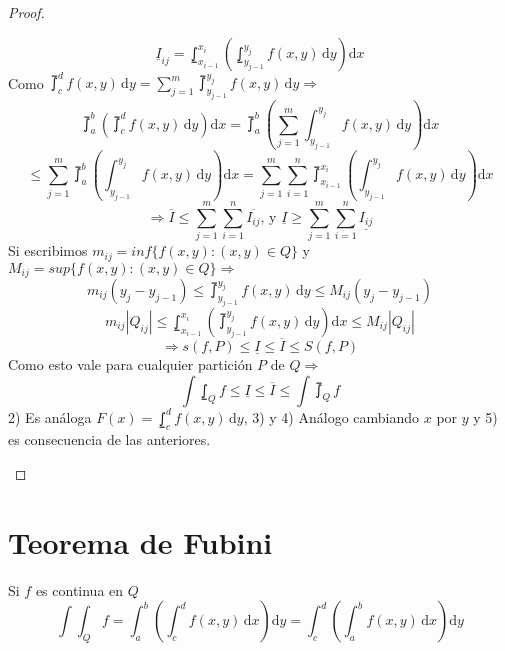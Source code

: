 \begin{theorem}
\begin{proof}
\begin{enumerate}
\begin{equation}
        \underline{I}_{ij} = \lowint_{x_{i-1}}^{x_i}( \lowint_{y_{j-1}}^{y_j}f(x, y)\,\mathrm{d}y)\mathrm{d}x
      \end{equation} Como $\upint_c^d f(x, y)\, \mathrm{d}y = \sum_{j = 1}^m \upint_{y_{j-1}}^{y_j} f(x, y)\, \mathrm{d}y \Rightarrow$ \begin{equation}
        \upint_a^b(\upint_c^d f(x, y)\, \mathrm{d}y)\mathrm{d}x = \upint_a^b( \sum_{j = 1}^m \int_{y_{j-1}}^{y_j}f(x, y)\, \mathrm{d}y)\mathrm{d}x
      \end{equation}
      \begin{equation}
        \leq \sum_{j = 1}^m \upint_a^b(\int_{y_{j-1}}^{y_j}f(x, y)\, \mathrm{d}y)\mathrm{d}x = \sum_{j = 1}^m \sum_{i = 1}^n \upint_{x_{i-1}}^{x_i}(\int_{y_{j-1}}^{y_j}f(x,y)\,\mathrm{d}y)\mathrm{d}x
      \end{equation}
      \begin{equation}
        \Rightarrow \overline{I} \leq \sum_{j = 1}^m \sum_{i = 1}^n \overline{I_{ij}} \text{, y } \underline{I} \geq \sum_{j = 1}^m \sum_{i = 1}^n \underline{I_{ij}}
      \end{equation}
      Si escribimos $m_{ij} = inf\{ f(x, y) : (x, y) \in Q \}$ y $M_{ij} = sup\{ f(x, y) : (x, y) \in Q\} \Rightarrow$ \begin{equation}
        m_{ij} (y_j - y_{j-1}) \leq \upint_{y_{j-1}}^{y_j} f(x, y)\, \mathrm{d} y \leq M_{ij} (y_j - y_{j-1})
      \end{equation}
      \begin{equation}
        m_{ij} |Q_{ij}| \leq \lowint_{x_{i-1}}^{x_i} ( \upint_{y_{j-1}}^{y_j} f(x, y)\, \mathrm{d}y )\mathrm{d}x \leq M_{ij} |Q_{ij}|
      \end{equation}
      \begin{equation}
        \Rightarrow s(f, P) \leq \underline{I} \leq \overline{I} \leq S(f, P)
      \end{equation} Como esto vale para cualquier partición $P$ de $Q \Rightarrow$ \begin{equation}
        \int\lowint_Q f \leq \underline{I} \leq \overline{I} \leq \int\upint_Q f
      \end{equation}
      2) Es análoga $F(x) = \lowint_c^d f(x, y) \, \mathrm{d}y$, 3) y 4) Análogo cambiando $x$ por $y$ y 5) es consecuencia de las anteriores.
    \end{enumerate}
  \end{proof}
\end{theorem}

\section{Teorema de Fubini}
\begin{corollary}[Fubini]
  Si $f$ es continua en $Q$ \begin{equation}
    \int\int_Q f = \int_a^b(\int_c^d f(x, y) \, \mathrm{d}x) \mathrm{d}y = \int_c^d(\int_a^b f(x, y)\, \mathrm{d}x)\mathrm{d}y
  \end{equation}
\end{corollary}

